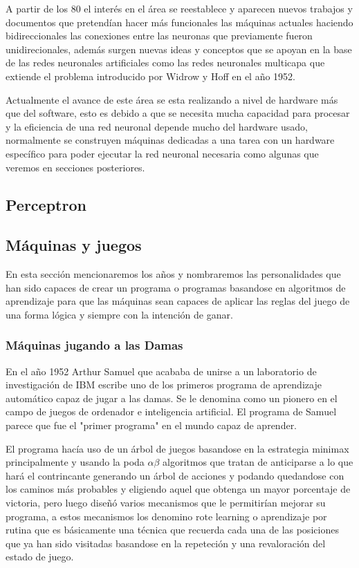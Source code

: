\documentclass[a4paper, 11pt]{article} %
\begin{document}
A partir de los 80 el interés en el área se reestablece y aparecen nuevos trabajos y documentos que pretendían hacer más funcionales las máquinas actuales haciendo bidireccionales las conexiones entre las neuronas que previamente fueron unidirecionales, además surgen nuevas ideas y conceptos que se apoyan en la base de las redes neuronales artificiales como las redes neuronales multicapa que extiende el problema introducido por Widrow y Hoff en el año 1952. 

Actualmente el avance de este área se esta realizando a nivel de hardware más que del software, esto es debido a que se necesita mucha capacidad para procesar y la eficiencia de una red neuronal depende mucho del hardware usado, normalmente se construyen máquinas dedicadas a una tarea con un hardware específico para poder ejecutar la red neuronal necesaria como algunas que veremos en secciones posteriores.

\subsection{Perceptron}
\subsection{Máquinas y juegos}
En esta sección mencionaremos los años y nombraremos las personalidades que han sido capaces de crear un programa o programas basandose en algoritmos de aprendizaje para que las máquinas sean capaces de aplicar las reglas del juego de una forma lógica y siempre con la intención de ganar.
\subsubsection{Máquinas jugando a las Damas}
En el año 1952 Arthur Samuel que acababa de unirse a un laboratorio de investigación de IBM escribe uno de los primeros programa de aprendizaje automático capaz de jugar a las damas. Se le denomina como un pionero en el campo de juegos de ordenador e inteligencia artificial. El programa de Samuel parece que fue el "primer programa" en el mundo capaz de aprender.

El programa hacía uso de un árbol de juegos basandose en la estrategia minimax principalmente y usando la poda $\alpha\beta$ algoritmos que tratan de anticiparse a lo que hará el contrincante generando un árbol de acciones y podando quedandose con los caminos más probables y eligiendo aquel que obtenga un mayor porcentaje de victoria, pero luego diseñó varios mecanismos que le permitirían mejorar su programa, a estos mecanismos los denomino rote learning o aprendizaje por rutina que es básicamente una técnica que recuerda cada una de las posiciones que ya han sido visitadas basandose en la repeteción y una revaloración del estado de juego.
\end{document}
